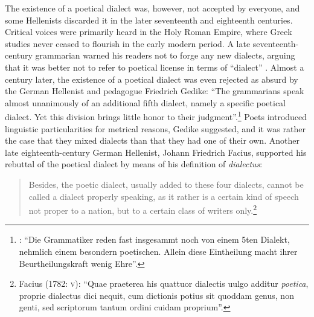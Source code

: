 The existence of a poetical dialect was, however, not accepted by everyone, and some Hellenists discarded it in the later seventeenth and eighteenth centuries. Critical voices were primarily heard in the Holy Roman Empire, where Greek studies never ceased to flourish in the early modern period. A late seventeenth-century grammarian warned his readers not to forge any new dialects, arguing that it was better not to refer to poetical license in terms of “dialect” \citep[512]{Ursin1691}. Almost a century later, the existence of a poetical dialect was even rejected as absurd by the German Hellenist and pedagogue Friedrich Gedike: “The grammarians speak almost unanimously of an additional fifth dialect, namely a specific poetical dialect. Yet this division brings little honor to their judgment”.\footnote{\citet[21]{Gedike1782}: “Die Grammatiker reden fast insgesammt noch von einem 5ten Dialekt, nehmlich einem besondern poetischen. Allein diese Eintheilung macht ihrer Beurtheilungskraft wenig Ehre”.} Poets introduced linguistic particularities for metrical reasons, Gedike suggested, and it was rather the case that they mixed dialects than that they had one of their own. Another late eighteenth-century German Hellenist, Johann Friedrich Facius, supported his rebuttal of the poetical dialect by means of his definition of \textit{dialectus}:

\begin{quote}
Besides, the poetic dialect, usually added to these four dialects, cannot be called a dialect properly speaking, as it rather is a certain kind of speech not proper to a nation, but to a certain class of writers only.\footnote{Facius (1782: \textsc{v}): “Quae praeterea his quattuor dialectis uulgo additur \textit{poetica}, proprie dialectus dici nequit, cum dictionis potius sit quoddam genus, non genti, sed scriptorum tantum ordini cuidam proprium”.}
\end{quote}

